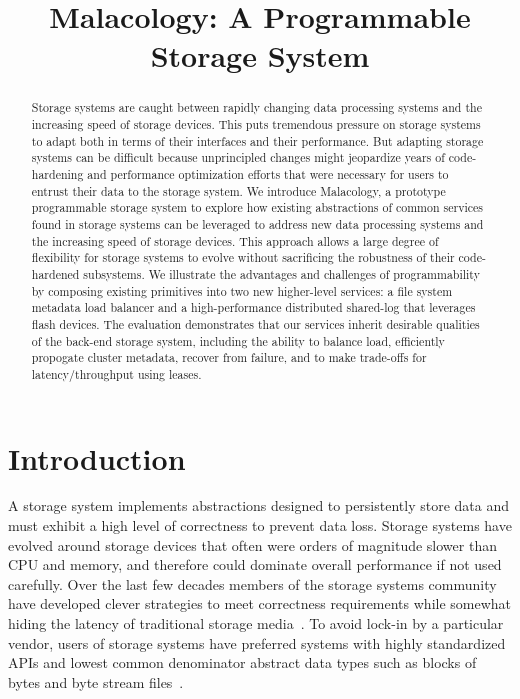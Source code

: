 \documentclass[preprint]{sigplanconf-eurosys}
\title{Malacology: A Programmable Storage System}
\date{}
\begin{document}
\maketitle

\begin{abstract}
Storage systems are caught between rapidly changing data
processing systems and the increasing speed of storage devices. This puts
tremendous pressure on storage systems to adapt both in terms of their
interfaces and their performance. But adapting storage systems can be difficult
because unprincipled changes might jeopardize years of code-hardening and
performance optimization efforts that were necessary for users to entrust their
data to the storage system.  We introduce  Malacology, a prototype programmable
storage system to explore how existing abstractions of common services found in
storage systems can be leveraged to address new data processing systems and the
increasing speed of storage devices. This approach allows a large degree of
flexibility for storage systems to evolve without sacrificing the robustness of
their code-hardened subsystems.  We illustrate the advantages and challenges of
programmability by composing existing primitives into two new higher-level
services: a file system metadata load balancer and a high-performance distributed
shared-log that leverages flash devices. The evaluation demonstrates that our
services inherit desirable qualities of the back-end storage system, including
the ability to balance load, efficiently propogate cluster metadata, recover
from failure, and to make trade-offs for latency/throughput using leases.
\end{abstract}

\section{Introduction}
\label{introduction}
\label{sec:intro}

A storage system implements abstractions designed to persistently store data
and must exhibit a high level of correctness to prevent data loss.  Storage
systems have evolved around storage devices that often were orders of magnitude
slower than CPU and memory, and therefore could dominate overall performance if
not used carefully. Over the last few decades members of the storage systems
community have developed clever strategies to meet correctness requirements
while somewhat hiding the latency of traditional storage
media~\cite{brewer_disks_2016}. To avoid lock-in by a particular vendor, users
of storage systems have preferred systems with highly standardized APIs and
lowest common denominator abstract data types such as blocks of bytes and byte
stream files~\cite{armbrust_view_2010}.
\end{document}
